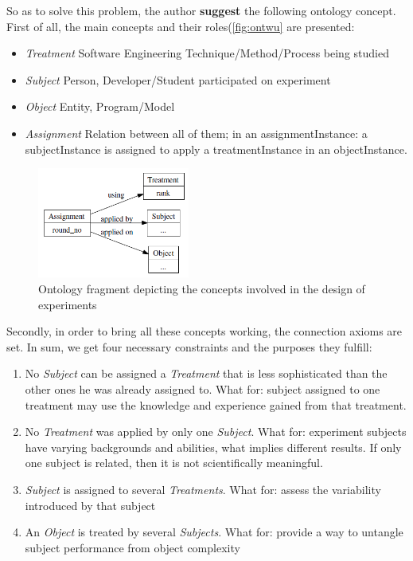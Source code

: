 	So as to solve this problem, the author \textbf{suggest} the following ontology concept. First of all, the main concepts and their roles(\autoref{fig:ontwu} are presented: 
	\begin{itemize}
		\item{\textit{Treatment}} Software Engineering Technique/Method/Process being studied
		\item{\textit{Subject}} Person, Developer/Student participated on experiment
		\item{\textit{Object}} Entity, Program/Model
		\item{\textit{Assignment}} Relation between all of them; in an assignmentInstance: a subjectInstance is assigned to apply a treatmentInstance in an objectInstance. 
	\end{itemize}
	\begin{figure}
		\centering
		\includegraphics[width=5cm]{images/OntWu.PNG}
		\caption{Ontology fragment depicting the concepts involved in the design of experiments\cite[p. 13]{SiyWu12}}
		\label{fig:ontwu}
	\end{figure} 
	Secondly, in order to bring all these concepts working, the connection axioms are set. In sum, we get four necessary constraints and the purposes they fulfill:
	\begin{enumerate}
		\item No \textit{Subject} can be assigned a \textit{Treatment} that is less sophisticated than the other ones he was already assigned to. What for: subject assigned to one treatment may use the knowledge and experience
		gained from that treatment.
		\item No \textit{Treatment} was applied by only one \textit{Subject}. What for: experiment subjects have varying backgrounds and abilities, what implies different results. If only one subject is related, then it is not scientifically meaningful.
		\item \textit{Subject} is assigned to several \textit{Treatments}. What for: assess the variability introduced by that subject
		\item An \textit{Object} is treated by several \textit{Subjects}. What for: provide a way to untangle subject performance from object complexity
	\end{enumerate}
	
